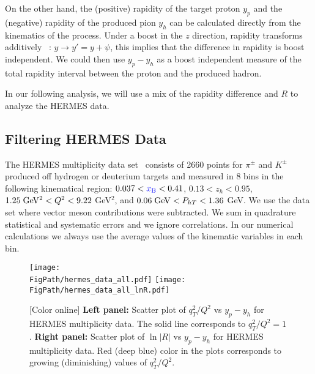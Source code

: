 \documentclass[final,3p,times,onecolumn,sort&compress,hidelinks]{elsarticle}
\newcommand{\xbj}{\ensuremath{{\cbl x_{\rm B}}}}
\newcommand\3[1]{\boldsymbol{#1}}
\newcommand{\cbl}{\color{blue}}
\newcommand*{\FigPath}{../Figs/}%
\begin{document}
On the other hand, the (positive) rapidity of the target proton $y_p$ and the (negative) rapidity of the produced pion $y_h$ can be calculated directly from the kinematics of the process. 
 Under a boost in the  $z$ direction, rapidity transforms additively ~\cite{Collins:2011zzd}: $y \to y' = y+\psi$, this implies that the difference in rapidity is boost independent.
We could then use $y_p - y_h$ as a boost independent measure of the total rapidity interval between the proton and the produced hadron.

In our following analysis, we will use a mix of the rapidity difference and $R$ to analyze the HERMES data.

\subsection{Filtering HERMES Data} 

The HERMES multiplicity data set~\cite{Airapetian:2012ki} consists of 2660 points for $\pi^\pm$ and $K^\pm$ produced off hydrogen or deuterium targets and measured in 8 bins in the following kinematical region: $0.037 < \xbj < 0.41$, $0.13 < z_h < 0.95$, $1.25\; {\rm GeV^2} < Q^2 < 9.22$ GeV$^2$,  and $0.06 \; {\rm GeV} < P_{hT} < 1.36$ GeV. We use the data set where vector meson contributions were subtracted. We sum in quadrature statistical and systematic errors and we ignore correlations. In our numerical calculations we always use the average values of the kinematic variables in each bin.
\begin{figure}[htb!]
\centering
\texttt{[image: \\FigPath/hermes\_data\_all.pdf]}
\texttt{[image: \\FigPath/hermes\_data\_all\_lnR.pdf]}
\caption{\label{Fig:hermes_data_rapidity}
[Color online]  {\bf Left panel:} Scatter plot of $q_T^2/Q^2$ vs $y_p-y_h$ for HERMES multiplicity data.  The solid line corresponds to $q_T^2/Q^2=1$. {\bf Right panel:} Scatter plot of $\ln|R|$  vs $y_p-y_h$ for HERMES multiplicity data. Red (deep blue) color in the plots corresponds to growing (diminishing) values of $q_T^2/Q^2$.
}
\end{figure}
\end{document}
